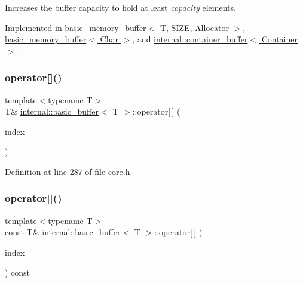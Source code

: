 Increases the buffer capacity to hold at least {\itshape capacity} elements. 

Implemented in \hyperlink{classbasic__memory__buffer_a2f01489b9805a99cdc93ab0aee6730eb}{basic\+\_\+memory\+\_\+buffer$<$ T, S\+I\+Z\+E, Allocator $>$}, \hyperlink{classbasic__memory__buffer_a2f01489b9805a99cdc93ab0aee6730eb}{basic\+\_\+memory\+\_\+buffer$<$ Char $>$}, and \hyperlink{classinternal_1_1container__buffer_a9dc9c633e12053ddf07af13b30b378b3}{internal\+::container\+\_\+buffer$<$ Container $>$}.

\mbox{\label{classinternal_1_1basic__buffer_a26cd6fa0b2b4a74f95e4e56acd2715b5}} 
\subsubsection{\texorpdfstring{operator[]()}{operator[]()}\hspace{0.1cm}{\footnotesize\ttfamily [1/2]}}
{\footnotesize\ttfamily template$<$typename T$>$ \\
T\& \hyperlink{classinternal_1_1basic__buffer}{internal\+::basic\+\_\+buffer}$<$ T $>$\+::operator\mbox{[}$\,$\mbox{]} (\begin{DoxyParamCaption}\item[{std\+::size\+\_\+t}]{index }\end{DoxyParamCaption})\hspace{0.3cm}{\ttfamily [inline]}}



Definition at line 287 of file core.\+h.

\mbox{\label{classinternal_1_1basic__buffer_ad9101379d17c83684570cbbdb635b5c3}} 
\subsubsection{\texorpdfstring{operator[]()}{operator[]()}\hspace{0.1cm}{\footnotesize\ttfamily [2/2]}}
{\footnotesize\ttfamily template$<$typename T$>$ \\
const T\& \hyperlink{classinternal_1_1basic__buffer}{internal\+::basic\+\_\+buffer}$<$ T $>$\+::operator\mbox{[}$\,$\mbox{]} (\begin{DoxyParamCaption}\item[{std\+::size\+\_\+t}]{index }\end{DoxyParamCaption}) const\hspace{0.3cm}{\ttfamily [inline]}}



